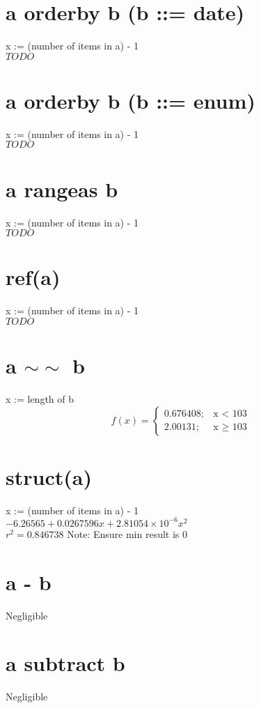 \documentclass[12pt]{article}
\begin{document}
	\section{a orderby b (b ::= date)}
	x := (number of items in a) - 1\\
	$TODO$
	
	\section{a orderby b (b ::= enum)}
	x := (number of items in a) - 1\\
	$TODO$
	
	\section{a rangeas b}
	x := (number of items in a) - 1\\
	$TODO$
	
	\section{ref(a)}
	x := (number of items in a) - 1\\
	$TODO$
	
	\section{a $\sim\sim$ b}
	x := length of b
	\begin{displaymath}
		f(x) = \left\{
			\begin{array}{lr}
				0.676408; & \text{x $<$ 103}\\
				2.00131; & \text{x $\geq$ 103}
			\end{array}
		\right.
	\end{displaymath}
	
	\section{struct(a)}
	x := (number of items in a) - 1\\
	$-6.26565 + 0.0267596 x + 2.81054 \times 10^{-6} x ^2$\\
	$r^2 = 0.846738$
	Note: Ensure min result is 0
	
	\section{a - b}
	Negligible
	
	\section{a subtract b}
	Negligible
	
\end{document}
